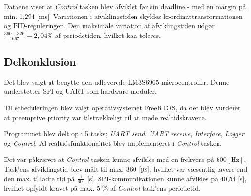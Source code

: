 Dataene viser at \textit{Control} tasken blev afviklet før sin deadline - med en margin på min. 1,294 [ms].
Variationen i afviklingstiden skyldes koordinattransformationen og PID-reguleringen.
Den maksimale variation af afviklingstiden udgør $ \frac{360 - 326}{1667} = 2,04 \% $ af periodetiden, hvilket kan toleres. 


\subsection{Delkonklusion}
Det blev valgt at benytte den udleverede LM3S6965 microcontroller.
Denne understøtter SPI og UART som hardware moduler. 

Til scheduleringen blev valgt operativsystemet FreeRTOS,
da det blev vurderet at preemptive priority var tilstrækkeligt til at møde realtidskravene. 

Programmet blev delt op i 5 tasks; \textit{UART send}, \textit{UART receive}, \textit{Interface}, \textit{Logger} og \textit{Control}. 
Al realtidsfunktionalitet blev implementeret i \textit{Control}-tasken. 

Det var påkrævet at \textit{Control}-tasken kunne afvikles med en frekvens på $600 \mathrm{[Hz]}$. 
Task'ens afviklingstid blev målt til max. 360 $\mathrm{[\micro s]}$, hvilket var væsentlig lavere end den max. tilladte tid på $\frac{1}{600}$ [s]. 
SPI-kommunikationen kunne afvikles på 40,54 [\micro s], hvilket opfyldt kravet på max. 5 \% af \textit{Control}-task'ens periodetid. 

